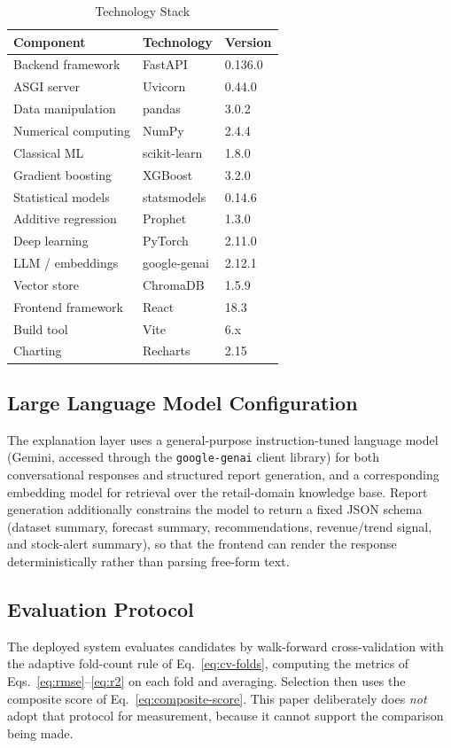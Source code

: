 \begin{table}[!t]
\caption{Technology Stack}
\label{tab:tech-stack}
\centering
\begin{tabular}{@{}p{2.5cm}p{2.0cm}p{2.5cm}@{}}
\toprule
\textbf{Component} & \textbf{Technology} & \textbf{Version} \\
\midrule
Backend framework & FastAPI & 0.136.0 \\
ASGI server & Uvicorn & 0.44.0 \\
Data manipulation & pandas & 3.0.2 \\
Numerical computing & NumPy & 2.4.4 \\
Classical ML & scikit-learn & 1.8.0 \\
Gradient boosting & XGBoost & 3.2.0 \\
Statistical models & statsmodels & 0.14.6 \\
Additive regression & Prophet & 1.3.0 \\
Deep learning & PyTorch & 2.11.0 \\
LLM / embeddings & google-genai & 2.12.1 \\
Vector store & ChromaDB & 1.5.9 \\
Frontend framework & React & 18.3 \\
Build tool & Vite & 6.x \\
Charting & Recharts & 2.15 \\
\bottomrule
\end{tabular}
\end{table}

\subsection{Large Language Model Configuration}
The explanation layer uses a general-purpose instruction-tuned language model (Gemini, accessed through the \texttt{google-genai} client library) for both conversational responses and structured report generation, and a corresponding embedding model for retrieval over the retail-domain knowledge base. Report generation additionally constrains the model to return a fixed JSON schema (dataset summary, forecast summary, recommendations, revenue/trend signal, and stock-alert summary), so that the frontend can render the response deterministically rather than parsing free-form text.

\subsection{Evaluation Protocol}
The deployed system evaluates candidates by walk-forward cross-validation with the adaptive fold-count rule of Eq.~\eqref{eq:cv-folds}, computing the metrics of Eqs.~\eqref{eq:rmse}--\eqref{eq:r2} on each fold and averaging. Selection then uses the composite score of Eq.~\eqref{eq:composite-score}. This paper deliberately does \emph{not} adopt that protocol for measurement, because it cannot support the comparison being made.

